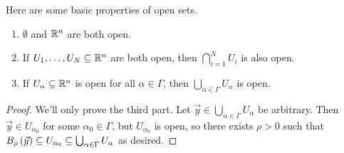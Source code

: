\documentclass[main.tex]{subfiles}
\begin{document}
\begin{proposition}
    Here are some basic properties of open sets.
    \begin{enumerate}
        \item $\emptyset$ and $\mathbb R^n$ are both open.
        \item If $U_1, \ldots , U_N\subseteq \mathbb R^n$ are both open, then $\bigcap_{i = 1}^N U_i$ is also open.
        \item If $U_\alpha\subseteq \mathbb R^n$ is open for all $\alpha\in \Gamma$, then $\bigcup_{\alpha\in \Gamma} U_\alpha$ is open.
    \end{enumerate}
\end{proposition}

\begin{proof}
    We'll only prove the third part. Let $\vec{y}\in \bigcup_{\alpha\in \Gamma} U_\alpha$ be arbitrary. Then $\vec{y}\in U_{\alpha_0}$ for some $\alpha_0\in \Gamma$, but $U_{\alpha_0}$ is open, so there exists $\rho > 0$ such that $B_\rho\left( \vec{y} \right) \subseteq U_{\alpha_0}\subseteq \bigcup_{\alpha\in \Gamma} U_\alpha$ as desired.
\end{proof}
\end{document}
